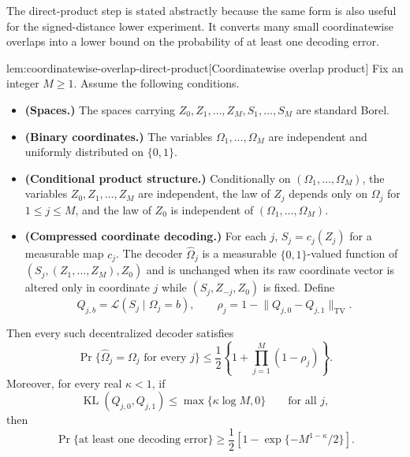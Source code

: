 \documentclass[11pt]{article}
\begin{document}
The direct-product step is stated abstractly because the same form is also useful for the signed-distance lower experiment. It converts many small coordinatewise overlaps into a lower bound on the probability of at least one decoding error.

\begin{lemmav}{lem:coordinatewise-overlap-direct-product}[Coordinatewise overlap product]
Fix an integer \(M\geq 1\). Assume the following conditions.
\begin{itemize}
\item \textbf{(Spaces.)} The spaces carrying \(Z_0,Z_1,\ldots,Z_M,S_1,\ldots,S_M\) are standard Borel.
\item \textbf{(Binary coordinates.)} The variables \(\Omega_1,\ldots,\Omega_M\) are independent and uniformly distributed on \(\{0,1\}\).
\item \textbf{(Conditional product structure.)} Conditionally on \((\Omega_1,\ldots,\Omega_M)\), the variables \(Z_0,Z_1,\ldots,Z_M\) are independent, the law of \(Z_j\) depends only on \(\Omega_j\) for \(1\leq j\leq M\), and the law of \(Z_0\) is independent of \((\Omega_1,\ldots,\Omega_M)\).
\item \textbf{(Compressed coordinate decoding.)} For each \(j\), \(S_j=c_j(Z_j)\) for a measurable map \(c_j\). The decoder \(\widehat\Omega_j\) is a measurable \(\{0,1\}\)-valued function of \((S_j,(Z_1,\ldots,Z_M),Z_0)\) and is unchanged when its raw coordinate vector is altered only in coordinate \(j\) while \((S_j,Z_{-j},Z_0)\) is fixed. Define
\[
 Q_{j,b}=\mathcal L(S_j\mid\Omega_j=b),
 \qquad
 \rho_j=1-\lVert Q_{j,0}-Q_{j,1}\rVert_{\mathrm{TV}}.
\]
\end{itemize}
Then every such decentralized decoder satisfies
\[
 \Pr\{\widehat\Omega_j=\Omega_j\text{ for every }j\}
 \leq
 \frac12\left\{1+\prod_{j=1}^M(1-\rho_j)\right\}.
\]
Moreover, for every real \(\kappa<1\), if
\[
 \operatorname{KL}(Q_{j,0},Q_{j,1})\leq \max\{\kappa\log M,0\}
 \qquad\text{for all }j,
\]
then
\[
 \Pr\{\text{at least one decoding error}\}
 \geq
 \frac12\left[1-\exp\{-M^{1-\kappa}/2\}\right].
\]
\end{lemmav}
\end{document}
